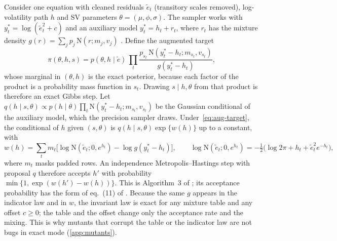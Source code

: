 Consider one equation with cleaned residuals $\tilde e_t$ (transitory scales removed), log-volatility
path $h$ and SV parameters $\theta = (\mu, \phi, \sigma)$.
The sampler works with $y^*_t = \log(\tilde e_t^2 + c)$ and an auxiliary model $y^*_t = h_t +
r_t$, where $r_t$ has the mixture density $g(r) = \sum_j p_j\,\mathrm{N}(r; m_j, v_j)$
\citep{kim1998stochastic,omori2007stochastic}.
Define the augmented target
\begin{equation}\label{eq:aug-target}
\pi(\theta, h, s) = p(\theta, h \mid \tilde e)\, \prod_t \frac{p_{s_t}\,\mathrm{N}(y^*_t - h_t;
m_{s_t}, v_{s_t})}{g(y^*_t - h_t)},
\end{equation}
whose marginal in $(\theta, h)$ is the exact posterior, because each factor of the product is a
probability mass function in $s_t$.
Drawing $s \mid h, \theta$ from that product is therefore an exact Gibbs step.
Let $q(h \mid s, \theta) \propto p(h \mid \theta) \prod_t \mathrm{N}(y^*_t - h_t; m_{s_t},
v_{s_t})$ be the Gaussian conditional of the auxiliary model, which the precision sampler draws.
Under~\eqref{eq:aug-target}, the conditional of $h$ given $(s, \theta)$ is $q(h \mid s, \theta)
\exp\{w(h)\}$ up to a constant, with
\begin{equation}\label{eq:B-w}
w(h) = \sum_t m_t \Big[\log \mathrm{N}(\tilde e_t; 0, e^{h_t}) - \log g(y^*_t - h_t)\Big],
\qquad \log \mathrm{N}(\tilde e_t; 0, e^{h_t}) = -\tfrac12\big(\log 2\pi + h_t + \tilde e_t^2
e^{-h_t}\big),
\end{equation}
where $m_t$ masks padded rows.
An independence Metropolis--Hastings step with proposal $q$ therefore accepts $h'$ with probability
$\min\{1, \exp(w(h') - w(h))\}$.
This is Algorithm~3 of \citet{delnegro2015time}; its acceptance probability has the form of
eq.~(11) of \citet{stroud2003nonlinear}.
Because the same $g$ appears in the indicator law and in $w$, the invariant law is exact for any
mixture table and any offset $c \ge 0$; the table and the offset change only the acceptance rate and
the mixing.
This is why mutants that corrupt the table or the indicator law are not bugs in exact mode
(\cref{app:mutants}).

